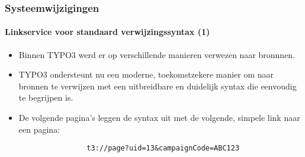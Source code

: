 \begin{frame}[fragile]
	\frametitle{Systeemwijzigingen}
	\framesubtitle{Linkservice voor standaard verwijzingssyntax (1)}

	\begin{itemize}

		\item Binnen TYPO3 werd er op verschillende manieren verwezen naar bronnnen.

		\item TYPO3 ondersteunt nu een moderne, toekomstzekere manier om naar bronnen te verwijzen met een uitbreidbare en
			duidelijk syntax die eenvoudig te begrijpen is.

		\item De volgende pagina's leggen de syntax uit met de volgende, simpele link naar een pagina:

			\begin{lstlisting}
				t3://page?uid=13&campaignCode=ABC123
			\end{lstlisting}

	\end{itemize}

\end{frame}

